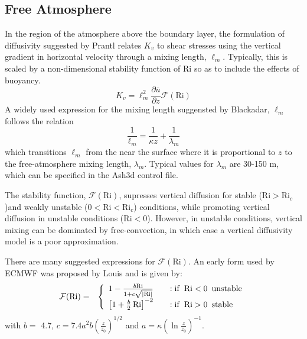 \subsection{Free Atmosphere}
In the region of the atmosphere above the boundary layer, the formulation of diffusivity
suggested by Prantl relates $K_v$ to shear stresses using the vertical gradient in
horizontal velocity through a mixing length, $\ell_m$. %
Typically, this is scaled by a non-dimensional stability function of $\mathrm{Ri}$ so as to
include the effects of buoyancy.
\begin{equation}\label{VarDiff_Eq_Kz_FreAtmos}
K_v = \ell_m^2 \frac{\partial \overline{u}}{\partial z}  \mathcal{F}(\mathrm{Ri})
\end{equation}
A widely used expression for the mixing length suggensted by Blackadar, $\ell_m$ follows the relation
\begin{equation}\label{VarDiff_Eq_MixLen}
\frac{1}{\ell_m} = \frac{1}{\kappa z} + \frac{1}{\lambda_m}
\end{equation}
which transitions $\ell_m$ from the near the surface where it is proportional to $z$
to the free-atmosphere mixing length, $\lambda_m$. Typical
values for $\lambda_m$ are 30-150 $\mathrm{m}$, which can be specified in the Ash3d control file.

The stability function, $\mathcal{F}(\mathrm{Ri})$, supresses vertical diffusion for stable
($\mathrm{Ri}>\mathrm{Ri}_c$)and weakly unstable ($0<\mathrm{Ri} < \mathrm{Ri}_c$) conditions,
while promoting vertical diffusion in unstable conditions ($\mathrm{Ri}<0$).
However, in unstable conditions, vertical mixing
can be dominated by free-convection, in which case a vertical diffusivity model is a poor approximation.


There are many suggested expressions for $\mathcal{F}(\mathrm{Ri})$. An early form used by ECMWF was proposed
by Louis \cite{Louis1979} and is given by:
\begin{eqnarray}\label{VarDiff_Eq_F_Louis}
\mathcal{F}(\mathrm{Ri}) &=& \left\{ \begin{array} {l@{\quad \quad}l}
 1 - \frac{b \mathrm{Ri}}{1+c \sqrt{\left| \mathrm{Ri}\right|}}  &: \mathrm{if}\,\,\, \mathrm{Ri} < 0 \,\,\, \mathrm{unstable} \\
 \left[ 1+ \frac{b}{2} \, \mathrm{Ri} \right]^{-2}               &: \mathrm{if}\,\,\, \mathrm{Ri} > 0 \,\,\, \mathrm{stable}
\end{array}
\right.
\end{eqnarray}
with $b =$ 4.7, $c=7.4 a^2b \left( \frac{z}{z_0} \right)^{1/2}$ and $a=\kappa \left(\ln{\frac{z}{z_0}} \right)^{-1}$.


